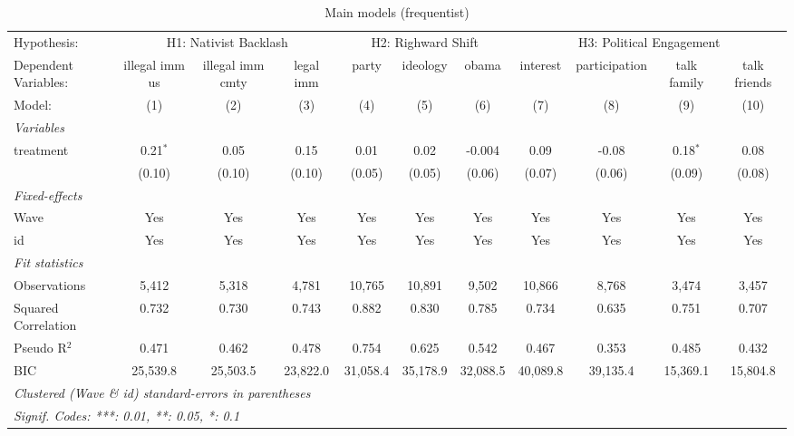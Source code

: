 
\begin{table}[htbp]
   \caption{\label{tab:main_FE} Main models (frequentist)}
   \centering
   \begin{tabular}{lcccccccccc}
      \tabularnewline \midrule \midrule
      Hypothesis: & \multicolumn{3}{c}{H1: Nativist Backlash} & \multicolumn{3}{c}{H2: Righward Shift} & \multicolumn{4}{c}{H3: Political Engagement} \\ 
      Dependent Variables: & illegal imm us & illegal imm cmty & legal imm & party    & ideology & obama    & interest & participation & talk family & talk friends\\  
      Model:               & (1)            & (2)              & (3)       & (4)      & (5)      & (6)      & (7)      & (8)           & (9)         & (10)\\  
      \midrule
      \emph{Variables}\\
      treatment            & 0.21$^{*}$     & 0.05             & 0.15      & 0.01     & 0.02     & -0.004   & 0.09     & -0.08         & 0.18$^{*}$  & 0.08\\   
                           & (0.10)         & (0.10)           & (0.10)    & (0.05)   & (0.05)   & (0.06)   & (0.07)   & (0.06)        & (0.09)      & (0.08)\\   
      \midrule
      \emph{Fixed-effects}\\
      Wave                 & Yes            & Yes              & Yes       & Yes      & Yes      & Yes      & Yes      & Yes           & Yes         & Yes\\  
      id                   & Yes            & Yes              & Yes       & Yes      & Yes      & Yes      & Yes      & Yes           & Yes         & Yes\\  
      \midrule
      \emph{Fit statistics}\\
      Observations         & 5,412          & 5,318            & 4,781     & 10,765   & 10,891   & 9,502    & 10,866   & 8,768         & 3,474       & 3,457\\  
      Squared Correlation  & 0.732          & 0.730            & 0.743     & 0.882    & 0.830    & 0.785    & 0.734    & 0.635         & 0.751       & 0.707\\  
      Pseudo R$^2$         & 0.471          & 0.462            & 0.478     & 0.754    & 0.625    & 0.542    & 0.467    & 0.353         & 0.485       & 0.432\\  
      BIC                  & 25,539.8       & 25,503.5         & 23,822.0  & 31,058.4 & 35,178.9 & 32,088.5 & 40,089.8 & 39,135.4      & 15,369.1    & 15,804.8\\  
      \midrule \midrule
      \multicolumn{11}{l}{\emph{Clustered (Wave \& id) standard-errors in parentheses}}\\
      \multicolumn{11}{l}{\emph{Signif. Codes: ***: 0.01, **: 0.05, *: 0.1}}\\
   \end{tabular}
\end{table}


